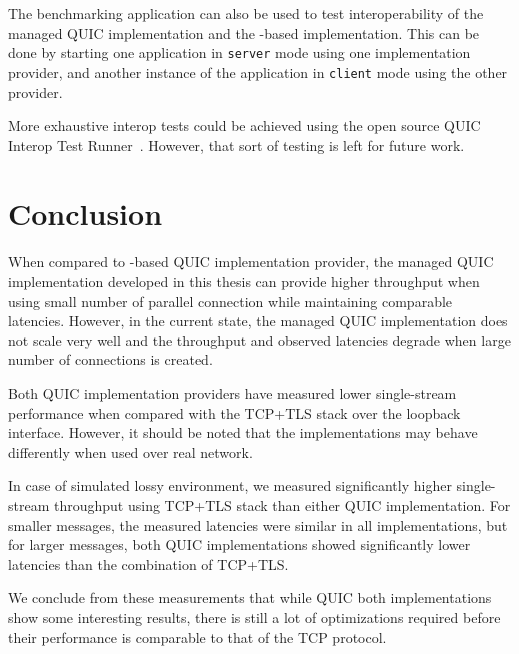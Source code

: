 The benchmarking application can also be used to test interoperability of the managed QUIC
implementation and the \libmsquic{}-based implementation. This can be done by starting one
application in \texttt{server} mode using one implementation provider, and another instance of the
application in \texttt{client} mode using the other provider.

More exhaustive interop tests could be achieved using the open source QUIC Interop Test
Runner~\cite{QuicInteropRunner}. However, that sort of testing is left for future work.

\section{Conclusion}


When compared to \libmsquic{}-based QUIC implementation provider, the managed QUIC implementation
developed in this thesis can provide higher throughput when using small number of parallel
connection while maintaining comparable latencies. However, in the current state, the managed QUIC
implementation does not scale very well and the throughput and observed latencies degrade when large
number of connections is created.

Both QUIC implementation providers have measured lower single-stream performance when compared with
the TCP+TLS stack over the loopback interface. However, it should be noted that the implementations
may behave differently when used over real network.

In case of simulated lossy environment, we measured significantly higher single-stream throughput
using TCP+TLS stack than either QUIC implementation. For smaller messages, the measured latencies
were similar in all implementations, but for larger messages, both QUIC implementations showed
significantly lower latencies than the combination of TCP+TLS.

We conclude from these measurements that while QUIC both implementations show some interesting
results, there is still a lot of optimizations required before their performance is comparable to
that of the TCP protocol.
